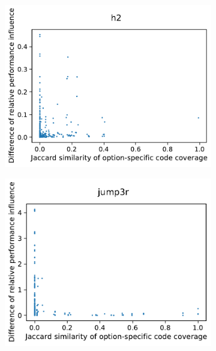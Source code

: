 \begin{figure}
\begin{subfigure}{0.33\textwidth}
		\includegraphics[width=\linewidth]{images/rq3.2/h2_rq3.2.pdf}
		\caption{\htwo}
	\end{subfigure}
	\begin{subfigure}{0.33\textwidth}
		\centering
		\includegraphics[width=\linewidth]{images/rq3.2/jump3r_rq3.2.pdf}
		\caption{\jumper}
	\end{subfigure}
	\begin{subfigure}{0.33\textwidth}
		\centering

\end{subfigure}
\end{figure}

